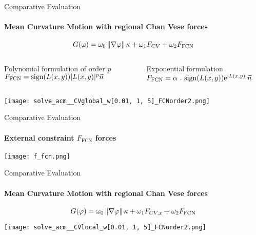 \begin{frame}{Comparative Evaluation}
    \framesubtitle{Mean Curvature Motion with  regional Chan Vese forces }

    $$ G(\varphi) = \omega_0 \left\lVert\nabla \varphi\right\rVert\kappa + \omega_1F_{CV} + \omega_2 F_{\textrm{FCN}}$$
    \begin{columns}
        \begin{column}{.5\textwidth}
    Polynomial formulation of order $p$
    $ F_{\textrm{FCN}} = \textrm{sign}(L(x, y)) |L(x, y)|^p \vec{n}$
        \end{column}
        \begin{column}{.5\textwidth}
            Exponential formulation
    $F_{\textrm{FCN}} = \alpha\ .\ \textrm{sign}(L(x, y)) \textrm{e}^{|L(x, y)|}\vec{n}$
        \end{column}
    \end{columns}
    \vspace{0.7cm}
    \texttt{[image: solve\_acm\_\_CVglobal\_w[0.01, 1, 5]\_FCNorder2.png]}
    
\end{frame}

\begin{frame}{Comparative Evaluation}
    \framesubtitle{External constraint $F_{\textrm{FCN}}$ forces}

    \begin{center}
    \tiny {} 

    \texttt{[image: f\_fcn.png]}
    \end{center}

\end{frame}

\begin{frame}{Comparative Evaluation}
    \framesubtitle{Mean Curvature Motion with  regional Chan Vese forces }

    $$ G(\varphi) = \omega_0 \left\lVert\nabla \varphi\right\rVert\kappa + \omega_1F_{CV, x} + \omega_2 F_{\textrm{FCN}}$$

    \vspace{0.7cm}
    \texttt{[image: solve\_acm\_\_CVlocal\_w[0.01, 1, 5]\_FCNorder2.png]}
\end{frame}

